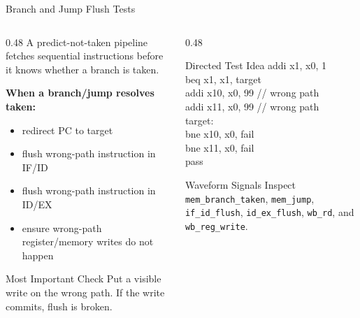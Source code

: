 \documentclass[aspectratio=169,10pt]{beamer}
\begin{document}
\begin{frame}{Branch and Jump Flush Tests}
  \begin{columns}[T]
    \begin{column}{0.48\textwidth}
      A predict-not-taken pipeline fetches sequential instructions before it knows whether a branch is taken.

      \vspace{0.6em}
      \textbf{When a branch/jump resolves taken:}
      \begin{itemize}
        \item redirect PC to target
        \item flush wrong-path instruction in IF/ID
        \item flush wrong-path instruction in ID/EX
        \item ensure wrong-path register/memory writes do not happen
      \end{itemize}

      \vspace{0.6em}
      \begin{alertblock}{Most Important Check}
        Put a visible write on the wrong path. If the write commits, flush is broken.
      \end{alertblock}
    \end{column}
    \begin{column}{0.48\textwidth}
      \begin{block}{Directed Test Idea}
        \ttfamily\scriptsize
        addi x1, x0, 1\\
        beq  x1, x1, target\\
        addi x10, x0, 99 \quad // wrong path\\
        addi x11, x0, 99 \quad // wrong path\\
        target:\\
        bne  x10, x0, fail\\
        bne  x11, x0, fail\\
        pass
      \end{block}

      \vspace{0.6em}
      \begin{exampleblock}{Waveform Signals}
        Inspect \texttt{mem\_branch\_taken}, \texttt{mem\_jump}, \texttt{if\_id\_flush}, \texttt{id\_ex\_flush}, \texttt{wb\_rd}, and \texttt{wb\_reg\_write}.
      \end{exampleblock}
    \end{column}
  \end{columns}
\end{frame}
\end{document}

